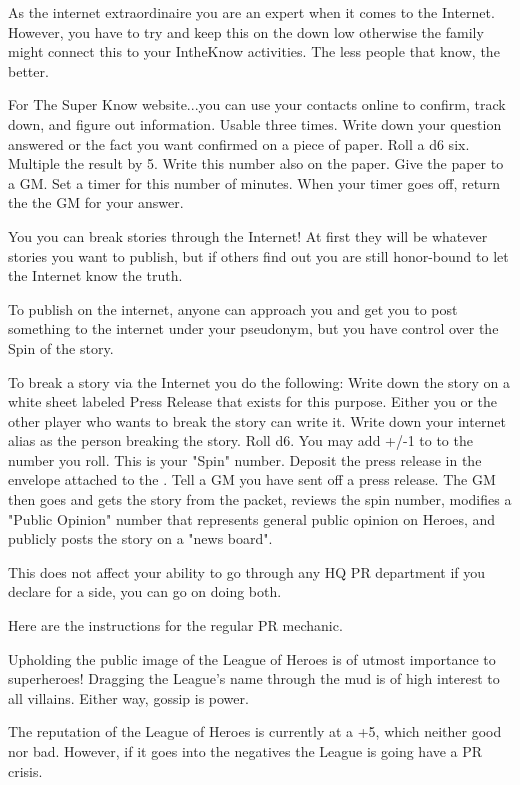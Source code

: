 \documentclass[green]{LRSguildcamp1}
\begin{document}
\name{\gInternetPR{}}

As \cTween{} the internet extraordinaire you are an expert when it comes to the Internet. However, you have to try and keep this on the down low otherwise the family might connect this to your IntheKnow activities. The less people that know, the better. 

For The Super Know website...you can use your contacts online to confirm, track down, and figure out information.  Usable three times. Write down your question answered or the fact you want confirmed on a piece of paper. Roll a d6 six. Multiple the result by 5. Write this number also on the paper. Give the paper to a GM. Set a timer for this number of minutes. When your timer goes off, return the the GM for your answer. 

You you can break stories through the Internet! At first they will be whatever stories you want to publish, but if others find out you are still honor-bound to let the Internet know the truth. 

To publish on the internet, anyone can approach you and get you to post something to the internet under your pseudonym, but you have control over the Spin of the story. 

To break a story via the Internet you do the following:
Write down the story on a white sheet labeled Press Release that exists for this purpose. Either you or the other player who wants to break the story can write it. 
Write down your internet alias as the person breaking the story.  
Roll d6.  You may add +/-1 to to the number you roll. This is your "Spin" number.
Deposit the press release in the envelope attached to the \sComputer{}. 
Tell a GM you have sent off a press release.
The GM then goes and gets the story from the packet, reviews the spin number, modifies a "Public Opinion" number that represents general public opinion on Heroes, and publicly posts the story on a "news board". 

This does not affect your ability to go through any HQ PR department if you declare for a side, you can go on doing both. 


Here are the instructions for the regular PR mechanic. 

Upholding the public image of the League of Heroes is of utmost importance to superheroes! 
Dragging the League's name through the mud is of high interest to all villains. Either way, gossip is power. 

The reputation of the League of Heroes is currently at a +5, which neither good nor bad. However, if it goes into the negatives the League is going have a PR crisis. 
\end{document}
